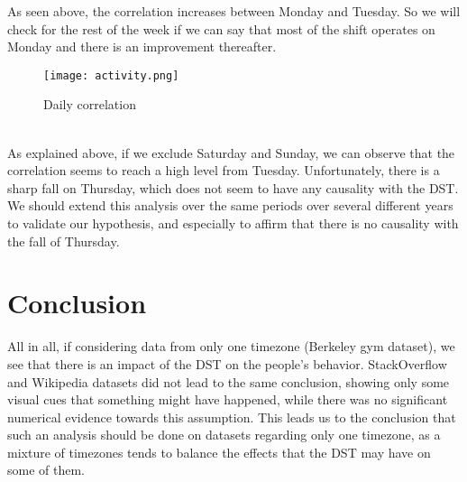 \documentclass[11pt]{article}
\begin{document}
As seen above, the correlation increases between Monday and Tuesday. So we will check for the rest of the week if we can say that most of the shift operates on Monday and there is an improvement thereafter.
\begin{figure}[h!]
\centering
\texttt{[image: activity.png]}
\caption{Daily correlation}
\end{figure}\\
As explained above, if we exclude Saturday and Sunday, we can observe that the correlation seems to reach a high level from Tuesday. Unfortunately, there is a sharp fall on Thursday, which does not seem to have any causality with the DST. We should extend this analysis over the same periods over several different years to validate our hypothesis, and especially to affirm that there is no causality with the fall of Thursday.


\section{Conclusion}
\label{sec:conclusion}
All in all, if considering data from only one timezone (Berkeley gym dataset), we see that there is an impact of the DST on the people's behavior. StackOverflow and Wikipedia datasets did not lead to the same conclusion, showing only some visual cues that something might have happened, while there was no significant numerical evidence towards this assumption. This leads us to the conclusion that such an analysis should be done on datasets regarding only one timezone, as a mixture of timezones tends to balance the effects that the DST may have on some of them.
\end{document}
